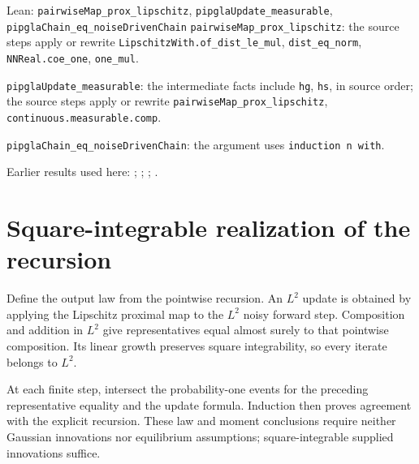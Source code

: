 \documentclass[11pt,a4paper]{article}
\begin{document}
\begin{leanbox}{Lean: \texttt{pairwiseMap\_\allowbreak{}prox\_\allowbreak{}lipschitz}, \texttt{pipglaUpdate\_\allowbreak{}measurable}, \texttt{pipglaChain\_\allowbreak{}eq\_\allowbreak{}noiseDrivenChain}}
\texttt{pairwise\allowbreak{}Map\_\allowbreak{}prox\_\allowbreak{}lipschitz}: the source steps apply or rewrite \texttt{Lipschitz\allowbreak{}With.\allowbreak{}of\_\allowbreak{}dist\_\allowbreak{}le\_\allowbreak{}mul}, \texttt{dist\_\allowbreak{}eq\_\allowbreak{}norm}, \texttt{NNReal.\allowbreak{}coe\_\allowbreak{}one}, \texttt{one\_\allowbreak{}mul}.



\texttt{pipgla\allowbreak{}Update\_\allowbreak{}measurable}: the intermediate facts include \texttt{hg}, \texttt{hs}, in source order; the source steps apply or rewrite \texttt{pairwise\allowbreak{}Map\_\allowbreak{}prox\_\allowbreak{}lipschitz}, \texttt{continuous.\allowbreak{}measurable.\allowbreak{}comp}.



\texttt{pipgla\allowbreak{}Chain\_\allowbreak{}eq\_\allowbreak{}noise\allowbreak{}Driven\allowbreak{}Chain}: the argument uses \texttt{induction n with}.
\end{leanbox}


Earlier results used here: \cite[Section~3.20.1]{LangevinLean2026ULASC}; \cite[Section~3.1.1]{LangevinLean2026IPLA}; \cite[Section~3.1.4]{LangevinLean2026IPLA}; \cite[Section~3.1.7]{LangevinLean2026IPLA}.

\section{\texorpdfstring{Square-integrable realization of the recursion}{Square-integrable realization of the recursion}}


Define the output law from the pointwise recursion. An \(L^2\) update is obtained by applying the Lipschitz proximal map to the \(L^2\) noisy forward step. Composition and addition in \(L^2\) give representatives equal almost surely to that pointwise composition. Its linear growth preserves square integrability, so every iterate belongs to \(L^2\).



At each finite step, intersect the probability-one events for the preceding representative equality and the update formula. Induction then proves agreement with the explicit recursion. These law and moment conclusions require neither Gaussian innovations nor equilibrium assumptions; square-integrable supplied innovations suffice.
\end{document}
